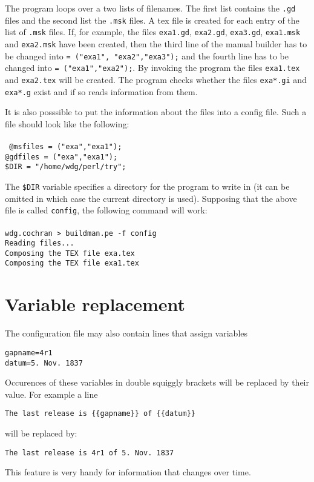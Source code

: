 \documentclass[a4wide]{article}
\begin{document}
The program loops over a two lists of filenames. The first list contains
the {\tt .gd} files and the second list the {\tt .msk} files. 
A tex file is created for each entry of the list of {\tt .msk} files.
If, for example, the files {\tt exa1.gd}, {\tt exa2.gd}, {\tt exa3.gd}, 
{\tt exa1.msk} and {\tt exa2.msk} have been created, then the third
line of the manual builder has to be changed into {\tt \@@gdfiles = ("exa1",
"exa2","exa3");} and the fourth line has to be changed into 
{\tt \@@msfiles = ("exa1","exa2");}.
By invoking the program the files {\tt exa1.tex} and {\tt exa2.tex} will be 
created. The program
checks whether the files {\tt exa*.gi} and {\tt exa*.g} exist and if so reads
information from them.\par
It is also posssible to put the information about the files into a config
file. Such a file should look like the following:\\
\vspace{2mm}\\
{\tt 
\noindent @msfiles = ("exa","exa1");\\
@gdfiles = ("exa","exa1");\\
\$DIR = "/home/wdg/perl/try";\\
}

The {\tt \$DIR} variable specifies a directory for the program to write in
(it can be omitted in which case the current directory is used). Supposing
that the above file is called {\tt config}, the following command will
work:\\
\vspace{2mm}\\
{\tt \noindent wdg.cochran > buildman.pe -f config\\
Reading files...\\
Composing the TEX file exa.tex\\
Composing the TEX file exa1.tex\\
}

\section{Variable replacement}

The configuration file may also contain lines that assign variables
\begin{verbatim}
gapname=4r1
datum=5. Nov. 1837
\end{verbatim}

Occurences of these variables in double squiggly brackets will be replaced
by their value. For example a line
\begin{verbatim}
The last release is {{gapname}} of {{datum}}
\end{verbatim}
will be replaced by:
\begin{verbatim}
The last release is 4r1 of 5. Nov. 1837
\end{verbatim}
This feature is very handy for information that changes over time.
\end{document}
